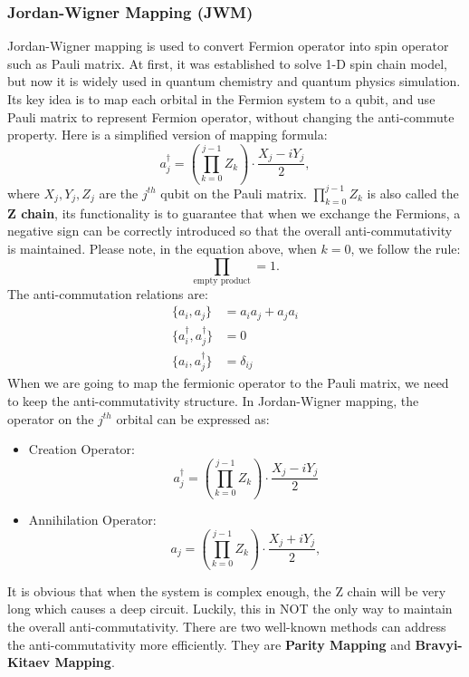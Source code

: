 \subsubsection{Jordan-Wigner Mapping (JWM)}
Jordan-Wigner mapping is used to convert Fermion operator into spin operator such as Pauli matrix. At first, it was established to solve 1-D spin chain model, but now it is widely used in quantum chemistry and quantum physics simulation. Its key idea is to map each orbital in the Fermion system to a qubit, and use Pauli matrix to represent Fermion operator, without changing the anti-commute property.
Here is a simplified version of mapping formula:
\begin{equation}
    a^\dagger_j=\left(\prod_{k=0}^{j-1}Z_k\right)\cdot \frac{X_j-iY_j}{2},
    \label{simplifiedJWM}
\end{equation}
where $X_j, Y_j, Z_j$ are the $j^{th}$ qubit on the Pauli matrix. $\prod_{k=0}^{j-1}Z_k$ is also called the \textbf{Z chain}, its functionality is to guarantee that when we exchange the Fermions, a  negative sign can be correctly introduced so that the overall anti-commutativity is maintained. Please note, in the equation above, when $k=0$, we follow the rule: 
\begin{equation}
    \prod_{\text{empty product}}=1.
\end{equation} 
The anti-commutation relations are:
\begin{equation}
\begin{aligned}
    \{a_i,a_j\} &= a_ia_j+a_ja_i \\
    \{a^\dagger_i, a^\dagger_j\} &= 0 \\
    \{a_i, a^\dagger_j\} &= \delta_{ij}
\end{aligned} 
\label{eqn:anti-comm}
\end{equation}
When we are going to map the fermionic operator to the Pauli matrix, we need to keep the anti-commutativity structure. In Jordan-Wigner mapping, the operator on the $j^{th}$ orbital can be expressed as:
\begin{itemize}
    \item Creation Operator:
    \begin{equation}
        a^\dagger_j=\left(\prod_{k=0}^{j-1}Z_k\right)\cdot\frac{X_j-iY_j}{2}        
    \end{equation}
    \item Annihilation Operator:
    \begin{equation}
        a_j=\left(\prod_{k=0}^{j-1}Z_k\right)\cdot\frac{X_j+iY_j}{2} ,     
    \end{equation}
\end{itemize}
It is obvious that when the system is complex enough, the Z chain will be very long which causes a deep circuit. Luckily, this in NOT the only way to maintain the overall anti-commutativity. There are two well-known methods can address the anti-commutativity more efficiently. They are \textbf{Parity Mapping} and \textbf{Bravyi-Kitaev Mapping}.

